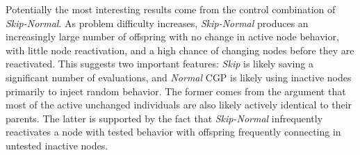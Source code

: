 \documentclass[journal]{IEEEtran}
\begin{document}
Potentially the most interesting results come from the control combination of
\emph{Skip-Normal}.  As problem difficulty increases, \emph{Skip-Normal} produces
an increasingly large number of offspring with no change in active node behavior,
with little node reactivation, and a high chance of changing nodes before
they are reactivated.  This suggests two important features: \emph{Skip} is likely
saving a significant number of evaluations, and \emph{Normal} CGP is likely using
inactive nodes primarily to inject random behavior.  The former comes from the
argument that most of the active unchanged individuals are also likely
actively identical to their parents.  The latter is supported by the fact that
\emph{Skip-Normal} infrequently reactivates a node with tested behavior with
offspring frequently connecting in untested inactive nodes.

%
%



%
%
\end{document}
